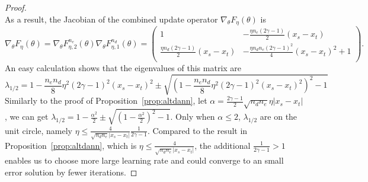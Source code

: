 \documentclass{article} \usepackage{iclr2023_conference,times}
\begin{document}
\begin{proof}
\begin{equation}
\end{equation}
As a result, the Jacobian of the combined update operator $\nabla_{\theta} F_{\eta}(\theta)$ is
 \begin{equation}
 \nabla_{\theta} F_{\eta}(\theta)=\nabla_{\theta}F^{n_e}_{\eta,2}(\theta)\nabla_{\theta}F^{n_d}_{\eta,1}(\theta)=\left(         \begin{array}{cc} 
    1&-\frac{\eta n_e(2\gamma-1)}{2}\left(x_s-x_t\right) \\ 
    \frac{\eta n_d(2\gamma-1)}{2}\left(x_s-x_t\right)&-\frac{\eta n_dn_e(2\gamma-1)^2} {4}\left(x_s-x_t\right)^2+1\\ 
  \end{array}\right).    
 \end{equation}
An easy calculation shows that the eigenvalues of this matrix are
\begin{equation}
\lambda_{1/2}=1-\frac{n_en_d}{8}\eta^2(2\gamma-1)^2(x_s-x_t)^2\pm \sqrt{\left(1-\frac{n_en_d}{8}\eta^2(2\gamma-1)^2(x_s-x_t)^2\right)^2-1}
\end{equation}
Similarly to the proof of Proposition~\ref{prop:altdann}, let $\alpha=\frac{2\gamma-1}{2}\sqrt{n_dn_e}\eta|x_s-x_t|$, we can get $\lambda_{1/2}=1-\frac{\alpha^2}{2}\pm\sqrt{\left(1-\frac{\alpha^2}{2}\right)^2-1}$. Only when $\alpha\leq2$, $\lambda_{1/2}$ are on the unit circle, namely $\eta\leq\frac{4}{\sqrt{n_dn_e}|x_s-x_t|}\frac{1}{2\gamma-1}$. Compared to the result in Proposition~\ref{prop:altdann}, which is $\eta\leq\frac{4}{\sqrt{n_dn_e}|x_s-x_t|}$, the additional $\frac{1}{2\gamma-1}>1$ enables us to choose more large learning rate and could converge to an small error solution by fewer iterations.
\end{proof}
\end{document}
